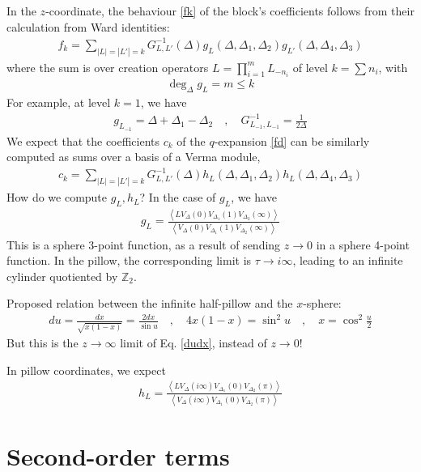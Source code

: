 \documentclass[12pt,a4paper]{article}
\begin{document}
In the $z$-coordinate, the behaviour \eqref{fk} of the block's coefficients follows from their calculation from Ward identities:
\begin{align}
 f_k = \sum_{|L|=|L'|=k} G^{-1}_{L,L'}(\Delta) g_L(\Delta,\Delta_1,\Delta_2)g_{L'}(\Delta,\Delta_4,\Delta_3)
\end{align}
where the sum is over creation operators $L=\prod_{i=1}^m L_{-n_i}$ of level $k=\sum n_i$, with 
\begin{align}
 \deg_\Delta g_L = m\leq k
\end{align}
For example, at level $k=1$, we have 
\begin{align}
 g_{L_{-1}} = \Delta + \Delta_1-\Delta_2 \quad , \quad G^{-1}_{L_{-1},L_{-1}} = \frac{1}{2\Delta} 
\end{align}
We expect that the coefficients $c_k$ of the $q$-expansion \eqref{fd} can be similarly computed as sums over a basis of a Verma module, 
\begin{align}
 c_k = \sum_{|L|=|L'|=k} G^{-1}_{L,L'}(\Delta) h_L(\Delta,\Delta_1,\Delta_2)h_L(\Delta,\Delta_4,\Delta_3)
\end{align}
How do we compute $g_L,h_L$? In the case of $g_L$, we have 
\begin{align}
 g_L = \frac{\left< LV_{\Delta}(0)V_{\Delta_1}(1)V_{\Delta_2}(\infty)\right>}{\left< V_{\Delta}(0)V_{\Delta_1}(1)V_{\Delta_2}(\infty)\right>}
\end{align}
This is a sphere 3-point function, as a result of sending $z\to 0$ in a sphere 4-point function. In the pillow, the corresponding limit is $\tau\to i\infty$, leading to an infinite cylinder quotiented by $\mathbb{Z}_2$. 

Proposed relation between the infinite half-pillow and the $x$-sphere:
\begin{align}
 du = \frac{dx}{\sqrt{x(1-x)}} = \frac{2dx}{\sin u} \quad , \quad 4x(1-x) = \sin^2u \quad , \quad x = \cos^2\tfrac{u}{2}
\end{align}
But this is the $z\to\infty$ limit of Eq. \eqref{dudx}, instead of $z\to 0$! 


In pillow coordinates, we expect
\begin{align}
 h_L = \frac{\left< LV_{\Delta}(i\infty)V_{\Delta_1}(0)V_{\Delta_2}(\pi)\right>}{\left< V_{\Delta}(i\infty)V_{\Delta_1}(0)V_{\Delta_2}(\pi)\right>}
\end{align}

\section{Second-order terms}
\end{document}
